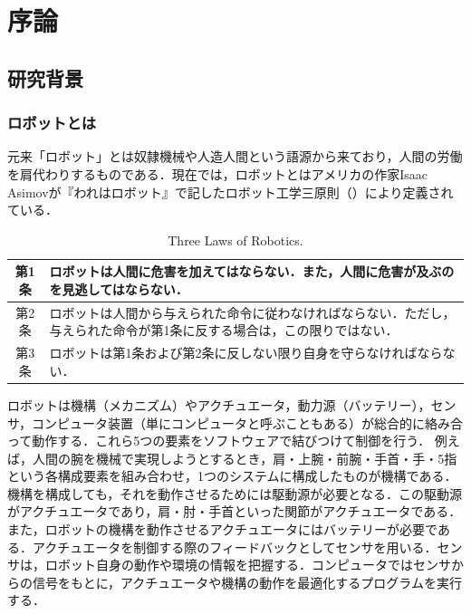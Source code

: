 \chapter{序論}
\label{chap_intro}
\newpage

\section{研究背景}
\subsection{ロボットとは}
元来「ロボット」とは奴隷機械や人造人間という語源から来ており，人間の労働を肩代わりするものである．現在では，ロボットとはアメリカの作家Isaac Asimovが『われはロボット』\cite{われはロボット}で記したロボット工学三原則（）により定義されている．
\begin{table}[H]
    \centering
    \caption[Three Laws of Robotics. ]{Three Laws of Robotics\cite{われはロボット}.}
    \begin{tabular}{cp{0.8\hsize}}\toprule
        第1条 & ロボットは人間に危害を加えてはならない．また，人間に危害が及ぶのを見逃してはならない． \\ \hline
        第2条 & ロボットは人間から与えられた命令に従わなければならない．ただし，与えられた命令が第1条に反する場合は，この限りではない． \\ \hline
        第3条 & ロボットは第1条および第2条に反しない限り自身を守らなければならない． \\ \bottomrule
    \end{tabular}
    \label{tab:ロボット三原則}
\end{table}

ロボットは機構（メカニズム）やアクチュエータ，動力源（バッテリー），センサ，コンピュータ装置（単にコンピュータと呼ぶこともある）が総合的に絡み合って動作する．これら5つの要素をソフトウェアで結びつけて制御を行う．
例えば，人間の腕を機械で実現しようとするとき，肩・上腕・前腕・手首・手・5指という各構成要素を組み合わせ，1つのシステムに構成したものが機構である．
機構を構成しても，それを動作させるためには駆動源が必要となる．この駆動源がアクチュエータであり，肩・肘・手首といった関節がアクチュエータである．
また，ロボットの機構を動作させるアクチュエータにはバッテリーが必要である．アクチュエータを制御する際のフィードバックとしてセンサを用いる．センサは，ロボット自身の動作や環境の情報を把握する．コンピュータではセンサからの信号をもとに，アクチュエータや機構の動作を最適化するプログラムを実行する．

